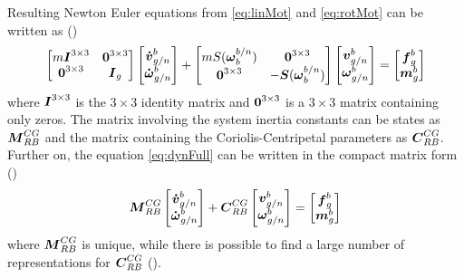 Resulting Newton Euler equations from \ref{eq:linMot} and \ref{eq:rotMot} can be written as (\cite{Fossen2011})
\begin{equation}\label{eq:dynFull}
  \begin{bmatrix}
    m\boldsymbol{I}^{3 \times 3} & \boldsymbol{0}^{3 \times 3}\\
    \boldsymbol{0}^{3 \times 3} & \boldsymbol{I}_{g}
  \end{bmatrix}	
  \begin{bmatrix}
    \boldsymbol{\dot{v}}_{g/n}^{b}\\
    \boldsymbol{\dot{\omega}}_{g/n}^{b}
  \end{bmatrix}
  +
  \begin{bmatrix}
    mS(\boldsymbol{\omega}_{b}^{b/n}) & \boldsymbol{0}^{3 \times 3}\\
    \boldsymbol{0}^{3 \times 3} & -\boldsymbol{S}(\boldsymbol{\omega}_{b}^{b/n})
  \end{bmatrix}
  \begin{bmatrix}
    \boldsymbol{v}_{g/n}^{b}\\
    \boldsymbol{\omega}_{g/n}^{b}
  \end{bmatrix}
  =
  \begin{bmatrix}
    \boldsymbol{f}_{g}^{b}\\
    \boldsymbol{m}_{g}^{b}
  \end{bmatrix}
\end{equation}
where $\boldsymbol{I}^{3 \times 3}$ is the $3\times3$ identity matrix and $\boldsymbol{0}^{3 \times 3}$ is a $3\times3$ matrix containing only zeros. 
The matrix involving the system inertia constants can be states as $\boldsymbol{M}_{RB}^{CG}$ and the matrix containing the Coriolis-Centripetal parameters as $\boldsymbol{C}_{RB}^{CG}$. Further on, 
the equation \ref{eq:dynFull} can be written in the compact matrix form (\cite{Fossen2011})
\begin{equation}\label{eq:dynCg}
  \boldsymbol{M}_{RB}^{CG}
  \begin{bmatrix}
    \boldsymbol{\dot{v}}_{g/n}^{b}\\
    \boldsymbol{\dot{\omega}}_{g/n}^{b}
  \end{bmatrix}
  +\boldsymbol{C}_{RB}^{CG}
  \begin{bmatrix}
    \boldsymbol{v}_{g/n}^{b}\\
    \boldsymbol{\omega}_{g/n}^{b}
  \end{bmatrix}
  =
  \begin{bmatrix}
    \boldsymbol{f}_{g}^{b}\\
    \boldsymbol{m}_{g}^{b}
  \end{bmatrix}
\end{equation}
where $\boldsymbol{M}_{RB}^{CG}$ is unique, while there is possible to find a large number of representations for $\boldsymbol{C}_{RB}^{CG}$ (\cite{Fossen2011}). 

